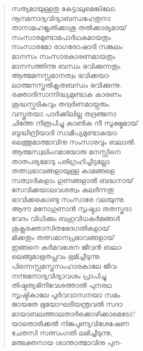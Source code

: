 \begin{verse}
സത്യമായുള്ളതു കേട്ടാലുമെങ്കിലോ.\\
നൂനമനാദ്യവിദ്യാബന്ധഹേതുനാ\\
താനാമഹങ്കൃതിക്കാശു തല്‍ക്കാര്യമായ്\\
സംസാരമുണ്ടാമപാര്‍ഥകമായതും\\
സംസാരമോ രാഗരോഷാദി സങ്കുലം\\
മാനസം സംസാരകാരണമായതും\\
മാനസത്തിന്നു ബന്ധം ഭവിക്കുന്നതും\\
ആത്മമനസ്സമാനത്വം ഭവിക്കയാ-\\
ലാത്മനസ്തല്‍കൃതബന്ധം ഭവിക്കുന്നു.\\
രക്താദിസാന്നിദ്ധ്യമുണ്ടാക കാരണം\\
ശുദ്ധസ്ഫടികവും തദ്വര്‍ണമായ്വരും.\\
വസ്തുതയാ പാര്‍ക്കിലില്ല തദ്രഞ്ജനാ\\
ചിത്തേ നിരൂപിച്ചു കാണ്‍ക നീ സൂക്ഷ്മമായ്\\
ബുദ്ധീന്ദ്രിയാദി സാമീപ്യമുണ്ടാകയാ-\\
ലെത്തുമാത്മാവിനു സംസാരവും ബലാല്‍.\\
ആത്മസ്വലിംഗമായോരു മനസ്സിനെ\\
താത്പര്യമോടു പരിഗ്രഹിച്ചിട്ടല്ലോ\\
തത്സ്വഭാവങ്ങളായുള്ള കാമങ്ങളെ\\
സത്വാദികളാം ഗുണങ്ങളാല്‍ ബദ്ധനായ്\\
സേവിക്കയാലവശത്വം കലര്‍ന്നതു\\
ഭാവിക്കകൊണ്ടു സംസാരേ വലയുന്നു.\\
ആദൗ മനോഗുണാന്‍ സൃഷ്ട്വാ തതസ്തദാ\\
വേദം വിധിക്കും ബഹുവിധകര്‍മങ്ങള്‍\\
ശുക്ലരക്താസിതഭേദഗതികളായ്\\
മിക്കതും തത്സമാനപ്രഭാവങ്ങളായ്\\
ഇങ്ങനെ കര്‍മവശേന ജീവന്‍ ബലാ-\\
ലെങ്ങുമാഭൂതപ്ലവം ഭ്രമിച്ചീടുന്നു.\\
പിന്നെസ്സമസ്തസംഹാരകാലേ ജീവ-\\
നന്നുമനാദ്യവിദ്യാവശം പ്രാപിച്ചു\\
തിഷ്ഠത്യഭിനിവേശത്താല്‍ പുനരഥ\\
സൃഷ്ടികാലേ പൂര്‍വവാസനയാ സമം\\
ജായതേ ഭൂയോഘടീയന്ത്രവല്‍ സദാ\\
മായാബലത്താലതാര്‍ക്കൊഴിക്കാമെടോ?\\
യാതൊരിക്കല്‍ നിജപുണ്യവിശേഷേണ\\
ചേതസി സത്സംഗതി ലഭിച്ചീടുന്നു,\\
മത്ഭക്തനായ ശാന്താത്മാവിനു പുന-\\

\end{verse}
